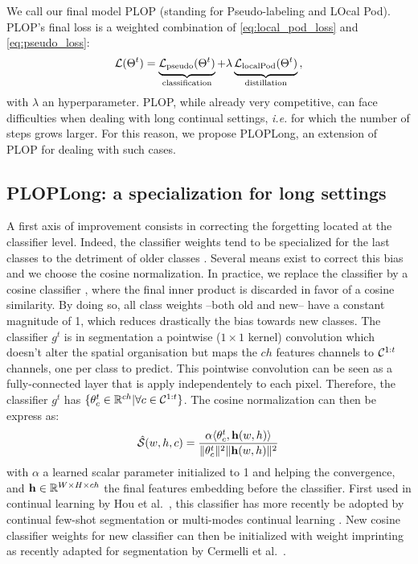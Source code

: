 We call our final model PLOP (standing for Pseudo-labeling and LOcal Pod). PLOP's final loss is a
weighted combination of \autoref{eq:local_pod_loss} and \autoref{eq:pseudo_loss}:
%
\begin{equation}
    \mathcal{L}(\Theta^t) = \underbrace{\strut \mathcal{L}_\text{pseudo}(\Theta^t)}_\text{classification} + \lambda\underbrace{\strut \mathcal{L}_\text{localPod}(\Theta^t)}_\text{distillation}\,,
    \label{eq:complete_loss}
\end{equation}
%
with $\lambda$ an hyperparameter. PLOP, while already very competitive, can face difficulties when
dealing with long continual settings, \textit{i.e.} for which the number of steps grows larger. For
this reason, we propose PLOPLong, an extension of PLOP for dealing with such cases.

\subsection{PLOPLong: a specialization for long settings}\label{sec:plopv2}

A first axis of improvement consists in correcting the forgetting located at the classifier level.
Indeed, the classifier weights tend to be specialized for the last classes to the detriment of older
classes \citep{hou2019ucir}. Several means exist to correct this bias
\citep{wu2019bias_correction,belouadah2019il2m,zhao2020weightalignement,luo2018cosine_classifier} and
we choose the cosine normalization. In practice, we replace the classifier by a cosine classifier
\citep{luo2018cosine_classifier}, where the final inner product is discarded in favor of a cosine
similarity. By doing so, all class weights --both old and new-- have a constant magnitude of 1,
which reduces drastically the bias towards new classes. The classifier $g^t$ is in segmentation a
pointwise ($1\times1$ kernel) convolution which doesn't alter the spatial organisation but maps the
$ch$ features channels to $\mathcal{C}^{1:t}$ channels, one per class to predict. This pointwise
convolution can be seen as a fully-connected layer that is apply independentely to each pixel.
Therefore, the classifier $g^t$ has $\{\theta_c^t \in \mathbb{R}^{ch} | \forall c \in \mathcal{C}^{1:t}\}$.
The cosine normalization can then be express as:
%
\begin{equation}
    \hat{\mathcal{S}}(w, h, c) = \frac{\alpha \langle \theta^t_c, \mathbf{h}(w, h) \rangle}{\Vert \theta^t_c \Vert^2 \Vert \mathbf{h}(w, h) \Vert^2}\,
    \label{eq:cosine_classifier}
\end{equation}
%
with $\alpha$ a learned scalar parameter initialized to 1 and helping the convergence, and $\mathbf{h} \in
    \mathbb{R}^{W \times H \times ch}$ the final features embedding before the classifier. First used in
continual learning by Hou et al.~\citep{hou2019ucir}, this classifier has more recently be adopted by
continual few-shot segmentation \citep{cermelli2020fewshotcontinualsegm} or multi-modes continual
learning \citep{douillard2020podnet}. New cosine classifier weights for new classifier can then be
initialized with weight imprinting \citep{qi2018imprintedweights} as recently adapted for
segmentation by Cermelli et al.~\citep{cermelli2020fewshotcontinualsegm}.


